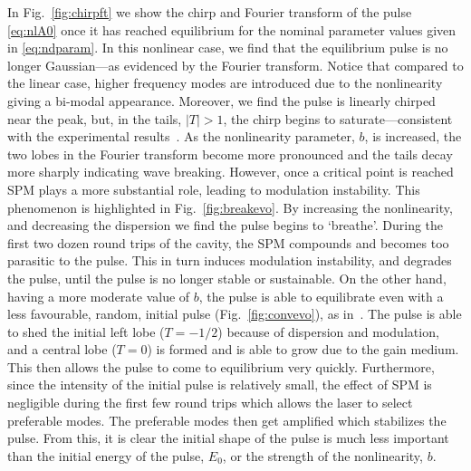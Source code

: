 \documentclass[9pt,twocolumn,twoside]{osajnl}
\begin{document}
In Fig.~\ref{fig:chirpft} we show the chirp and Fourier transform of the pulse \eqref{eq:nlA0} once it has reached equilibrium for the nominal parameter values given in \eqref{eq:ndparam}. In this nonlinear case, we find that the equilibrium pulse is no longer Gaussian---as evidenced by the Fourier transform. Notice that compared to the linear case, higher frequency modes are introduced due to the nonlinearity giving a bi-modal appearance. Moreover, we find the pulse is linearly chirped near the peak, but, in the tails, $|T| > 1$, the chirp begins to saturate---consistent with the experimental results~\cite{chen2008, rothenberg1989b, tomlinson1985}. As the nonlinearity parameter, $b$, is increased, the two lobes in the Fourier transform become more pronounced and the tails decay more sharply indicating wave breaking. However, once a critical point is reached SPM plays a more substantial role, leading to modulation instability. This phenomenon is highlighted in Fig.~\ref{fig:breakevo}. By increasing the nonlinearity, and decreasing the dispersion we find the pulse begins to `breathe'. During the first two dozen round trips of the cavity, the SPM compounds and becomes too parasitic to the pulse. This in turn induces modulation instability, and degrades the pulse, until the pulse is no longer stable or sustainable. On the other hand, having a more moderate value of $b$, the pulse is able to equilibrate even with a less favourable, random, initial pulse (Fig.~\ref{fig:convevo}), as in~\cite{meng2020}. The pulse is able to shed the initial left lobe ($T = -1 / 2$) because of dispersion and modulation, and a central lobe ($T = 0$) is formed and is able to grow due to the gain medium. This then allows the pulse to come to equilibrium very quickly. Furthermore, since the intensity of the initial pulse is relatively small, the effect of SPM is negligible during the first few round trips which allows the laser to select preferable modes. The preferable modes then get amplified which stabilizes the pulse. From this, it is clear the initial shape of the pulse is much less important than the initial energy of the pulse, $E_0$, or the strength of the nonlinearity, $b$.
\end{document}
